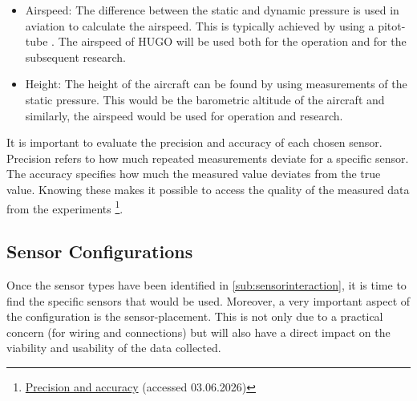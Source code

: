 \begin{itemize}
    \item Airspeed: The difference between the static and dynamic pressure is used in aviation to calculate the airspeed. This is typically achieved by using a pitot-tube \cite[p.~186]{anderson2016introduction}. The airspeed of HUGO will be used both for the operation and for the subsequent research.   
    \item Height: The height of the aircraft can be found by using measurements of the static pressure. This would be the barometric altitude of the aircraft and similarly, the airspeed would be used for operation and research.
    
\end{itemize}
It is important to evaluate the precision and accuracy of each chosen sensor. Precision refers to how much repeated measurements deviate for a specific sensor. The accuracy specifies how much the measured value deviates from the true value. Knowing these makes it possible to access the quality of the measured data from the experiments \footnote{\href{https://web.chem.ox.ac.uk/teaching/Physics\%20for\%20CHemists/Errors/Precision.html}{Precision and accuracy} (accessed 03.06.2026)}.


\subsection{Sensor Configurations}
\label{sub:SensorConfigurations}


Once the sensor types have been identified in \autoref{sub:sensorinteraction}, it is time to find the specific sensors that would be used. Moreover, a very important aspect of the configuration is the sensor-placement. This is not only due to a practical concern (for wiring and connections) but will also have a direct impact on the viability and usability of the data collected.


